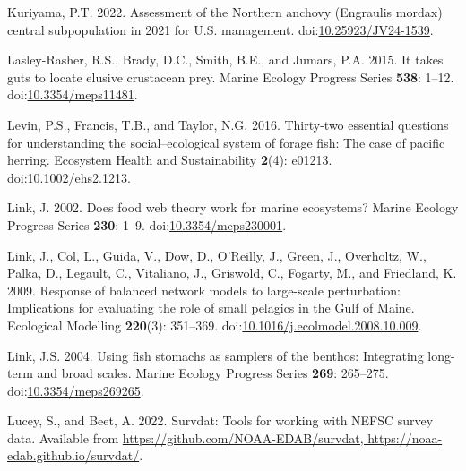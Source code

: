 \documentclass[
]{article}
\newlength{\cslhangindent}
\newlength{\cslentryspacingunit} %
\newenvironment{CSLReferences}[2] %
 {%
  \setlength{\parindent}{0pt}
  \ifodd #1
  \let\oldpar\par
  \def\par{\hangindent=\cslhangindent\oldpar}
  \fi
  \setlength{\parskip}{#2\cslentryspacingunit}
 }%
 {}
\begin{document}
\begin{CSLReferences}{1}{0}
\leavevmode{}%
Kuriyama, P.T. 2022. Assessment of the {Northern} anchovy ({Engraulis} mordax) central subpopulation in 2021 for {U}.{S}. management. doi:\href{https://doi.org/10.25923/JV24-1539}{10.25923/JV24-1539}.

\leavevmode{}%
Lasley-Rasher, R.S., Brady, D.C., Smith, B.E., and Jumars, P.A. 2015. It takes guts to locate elusive crustacean prey. Marine Ecology Progress Series \textbf{538}: 1--12. doi:\href{https://doi.org/10.3354/meps11481}{10.3354/meps11481}.

\leavevmode{}%
Levin, P.S., Francis, T.B., and Taylor, N.G. 2016. Thirty-two essential questions for understanding the social--ecological system of forage fish: The case of pacific herring. Ecosystem Health and Sustainability \textbf{2}(4): e01213. doi:\href{https://doi.org/10.1002/ehs2.1213}{10.1002/ehs2.1213}.

\leavevmode{}%
Link, J. 2002. Does food web theory work for marine ecosystems? Marine Ecology Progress Series \textbf{230}: 1--9. doi:\href{https://doi.org/10.3354/meps230001}{10.3354/meps230001}.

\leavevmode{}%
Link, J., Col, L., Guida, V., Dow, D., O'Reilly, J., Green, J., Overholtz, W., Palka, D., Legault, C., Vitaliano, J., Griswold, C., Fogarty, M., and Friedland, K. 2009. Response of balanced network models to large-scale perturbation: {Implications} for evaluating the role of small pelagics in the {Gulf} of {Maine}. Ecological Modelling \textbf{220}(3): 351--369. doi:\href{https://doi.org/10.1016/j.ecolmodel.2008.10.009}{10.1016/j.ecolmodel.2008.10.009}.

\leavevmode{}%
Link, J.S. 2004. Using fish stomachs as samplers of the benthos: Integrating long-term and broad scales. Marine Ecology Progress Series \textbf{269}: 265--275. doi:\href{https://doi.org/10.3354/meps269265}{10.3354/meps269265}.

\leavevmode{}%
Lucey, S., and Beet, A. 2022. Survdat: {Tools} for working with {NEFSC} survey data. Available from \href{https://github.com/NOAA-EDAB/survdat,\%20https://noaa-edab.github.io/survdat/}{https://github.com/NOAA-EDAB/survdat, https://noaa-edab.github.io/survdat/}.


\end{CSLReferences}
\end{document}
